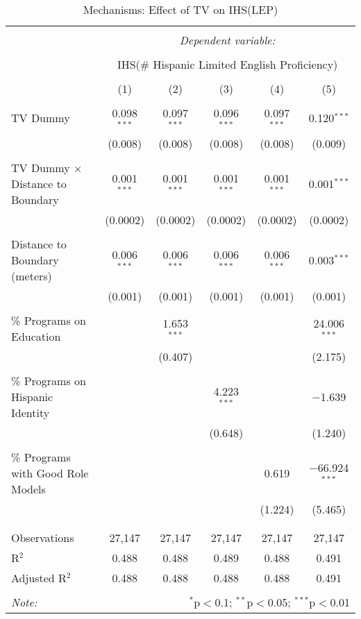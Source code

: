 
\begin{table}[!htbp] \centering 
  \caption{Mechanisms: Effect of TV on IHS(LEP)} 
  \label{} 
\begin{tabular}{@{\extracolsep{-2pt}}lccccc} 
\\[-1.8ex]\hline 
\hline \\[-1.8ex] 
 & \multicolumn{5}{c}{\textit{Dependent variable:}} \\ 
\cline{2-6} 
\\[-1.8ex] & \multicolumn{5}{c}{IHS(\# Hispanic Limited English Proficiency)} \\ 
\\[-1.8ex] & (1) & (2) & (3) & (4) & (5)\\ 
\hline \\[-1.8ex] 
 TV Dummy & 0.098$^{***}$ & 0.097$^{***}$ & 0.096$^{***}$ & 0.097$^{***}$ & 0.120$^{***}$ \\ 
  & (0.008) & (0.008) & (0.008) & (0.008) & (0.009) \\ 
  & & & & & \\ 
 TV Dummy $\times$ Distance to Boundary & 0.001$^{***}$ & 0.001$^{***}$ & 0.001$^{***}$ & 0.001$^{***}$ & 0.001$^{***}$ \\ 
  & (0.0002) & (0.0002) & (0.0002) & (0.0002) & (0.0002) \\ 
  & & & & & \\ 
 Distance to Boundary (meters) & 0.006$^{***}$ & 0.006$^{***}$ & 0.006$^{***}$ & 0.006$^{***}$ & 0.003$^{***}$ \\ 
  & (0.001) & (0.001) & (0.001) & (0.001) & (0.001) \\ 
  & & & & & \\ 
 \% Programs on Education &  & 1.653$^{***}$ &  &  & 24.006$^{***}$ \\ 
  &  & (0.407) &  &  & (2.175) \\ 
  & & & & & \\ 
 \% Programs on Hispanic Identity &  &  & 4.223$^{***}$ &  & $-$1.639 \\ 
  &  &  & (0.648) &  & (1.240) \\ 
  & & & & & \\ 
 \% Programs with Good Role Models &  &  &  & 0.619 & $-$66.924$^{***}$ \\ 
  &  &  &  & (1.224) & (5.465) \\ 
  & & & & & \\ 
\hline \\[-1.8ex] 
Observations & 27,147 & 27,147 & 27,147 & 27,147 & 27,147 \\ 
R$^{2}$ & 0.488 & 0.488 & 0.489 & 0.488 & 0.491 \\ 
Adjusted R$^{2}$ & 0.488 & 0.488 & 0.488 & 0.488 & 0.491 \\ 
\hline 
\hline \\[-1.8ex] 
\textit{Note:}  & \multicolumn{5}{r}{$^{*}$p$<$0.1; $^{**}$p$<$0.05; $^{***}$p$<$0.01} \\ 
\end{tabular} 
\end{table} 
